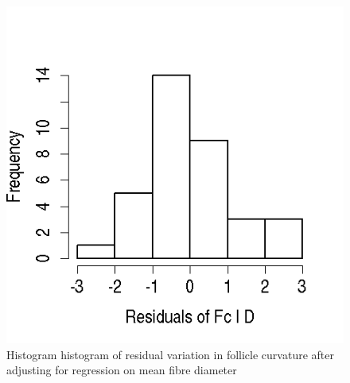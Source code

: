 %

\begin{figure}[]
\centering
    \includegraphics[scale=0.60]{fcdresidhist.png}
  \caption{Histogram histogram of residual variation in follicle curvature after adjusting for regression on mean fibre diameter}
\vfill
  \label{fig:residhist}
\end{figure}

%

